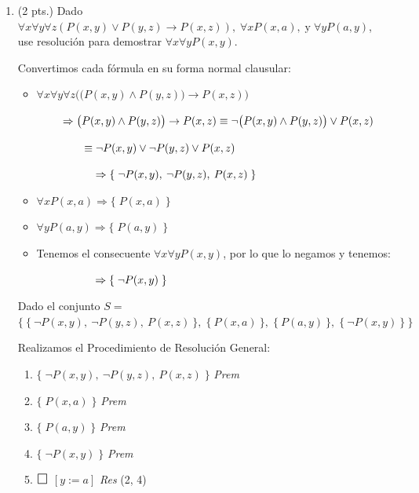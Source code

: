 \documentclass[12pt,letterpaper]{article}
\newcommand{\imp}{\rightarrow}
\begin{document}
\begin{enumerate}
  \newpage
  
\item (2 pts.) Dado \(\forall x \forall y \forall z (P(x,y) \lor P(y,z) \imp P(x,z)), \; \forall x P(x,a), \; \text{y} \; \forall y P(a,y)\),\\
  use resolución para demostrar \( \forall x \forall y P(x,y) \).
  \bigskip

  Convertimos cada f\'{o}rmula en su forma normal clausular:

  \begin{itemize}
  \item \( \forall x \forall y \forall z \Big(\big(P(x, y) \land P(y, z)\big) \imp P(x, z) \Big) \)
    
    \( \hspace{0.8cm} \Rightarrow \big(P(x, y) \land P(y, z)\big) \imp P(x, z) \equiv \neg \big(P(x, y) \land P(y, z)\big) \lor P(x, z) \)

    \( \hspace{1.5cm} \equiv \neg P(x, y) \lor \neg P(y, z) \lor P(x, z) \)

    \( \hspace{1.86cm} \Rightarrow \{\; {\neg P(x, y),\: \neg P(y, z),\: P(x, z) }\; \} \)

  \item \( \forall x P(x, a) \Rightarrow \{\; P(x, a)\; \} \)
  \item \( \forall y P(a, y) \Rightarrow \{\; P(a, y)\; \} \)
  \item Tenemos el consecuente \( \forall x \forall y P(x, y) \), por lo que lo negamos y tenemos:

    \( \hspace{1.86cm} \Rightarrow \{\; \neg P(x, y)\; \} \)
  \end{itemize}

  Dado el conjunto $S =$ \( \Big\{\: \{\: \neg P(x, y),\: \neg P(y, z),\: P(x, z) \: \}, \; \{\: P(x, a)\: \},\;  \{\: P(a, y)\: \},\; \{\: \neg P(x, y)\: \} \:\Big\} \)

  Realizamos el Procedimiento de Resoluci\'{o}n General:
  
  \begin{center}
    \begin{enumerate}[label=\arabic*.]
    \item \( \{\; {\neg P(x, y),\: \neg P(y, z),\: P(x, z) }\; \} \) \quad \textit{Prem}
    \item \( \{\; P(x, a)\; \} \) \hspace{3.9cm} \textit{Prem}
    \item \( \{\; P(a, y)\; \} \) \hspace{3.9cm} \textit{Prem}
    \item \( \{\; \neg P(x, y)\; \} \) \hspace{3.6cm} \textit{Prem}
    \item $\scalebox{1.3}{$\square$}$ \hspace{3.2cm} $[y := a]$ \hspace{0.55cm} \textit{Res} (2, 4)
    \end{enumerate}
  \end{center}


\end{enumerate}
\end{document}
